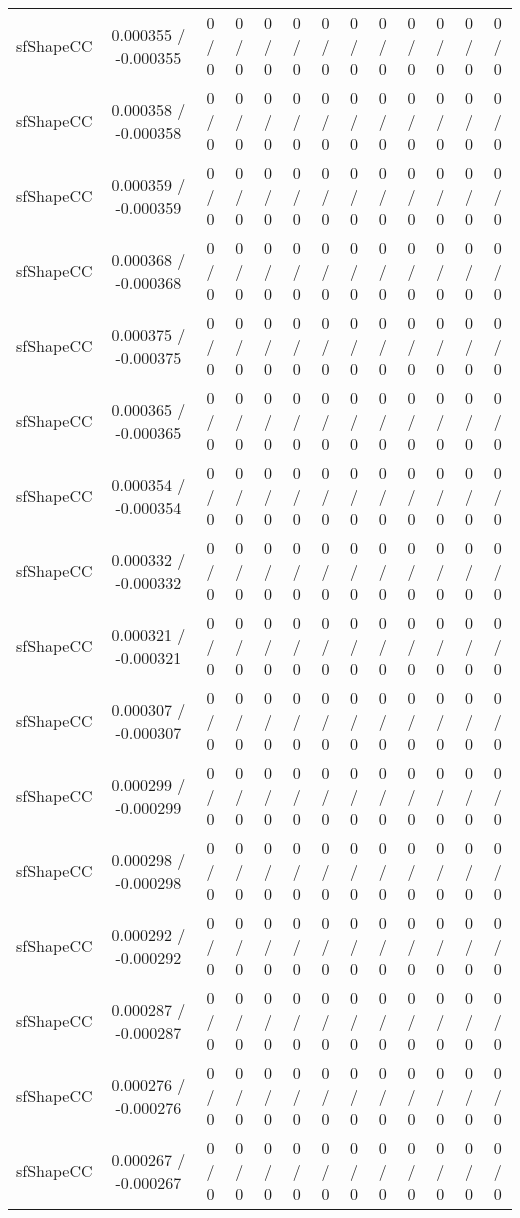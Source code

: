 \documentclass[10pt]{article}
\begin{document}
\begin{table}[htbp]
\begin{center}
\begin{tabular}{|c|c|c|c|c|c|c|c|c|c|c|c|c|}
  sfShapeCC & 0.000355 / -0.000355 & 0 / 0 & 0 / 0 & 0 / 0 & 0 / 0 & 0 / 0 & 0 / 0 & 0 / 0 & 0 / 0 & 0 / 0 & 0 / 0 & 0 / 0 \\ 
  sfShapeCC & 0.000358 / -0.000358 & 0 / 0 & 0 / 0 & 0 / 0 & 0 / 0 & 0 / 0 & 0 / 0 & 0 / 0 & 0 / 0 & 0 / 0 & 0 / 0 & 0 / 0 \\ 
  sfShapeCC & 0.000359 / -0.000359 & 0 / 0 & 0 / 0 & 0 / 0 & 0 / 0 & 0 / 0 & 0 / 0 & 0 / 0 & 0 / 0 & 0 / 0 & 0 / 0 & 0 / 0 \\ 
  sfShapeCC & 0.000368 / -0.000368 & 0 / 0 & 0 / 0 & 0 / 0 & 0 / 0 & 0 / 0 & 0 / 0 & 0 / 0 & 0 / 0 & 0 / 0 & 0 / 0 & 0 / 0 \\ 
  sfShapeCC & 0.000375 / -0.000375 & 0 / 0 & 0 / 0 & 0 / 0 & 0 / 0 & 0 / 0 & 0 / 0 & 0 / 0 & 0 / 0 & 0 / 0 & 0 / 0 & 0 / 0 \\ 
  sfShapeCC & 0.000365 / -0.000365 & 0 / 0 & 0 / 0 & 0 / 0 & 0 / 0 & 0 / 0 & 0 / 0 & 0 / 0 & 0 / 0 & 0 / 0 & 0 / 0 & 0 / 0 \\ 
  sfShapeCC & 0.000354 / -0.000354 & 0 / 0 & 0 / 0 & 0 / 0 & 0 / 0 & 0 / 0 & 0 / 0 & 0 / 0 & 0 / 0 & 0 / 0 & 0 / 0 & 0 / 0 \\ 
  sfShapeCC & 0.000332 / -0.000332 & 0 / 0 & 0 / 0 & 0 / 0 & 0 / 0 & 0 / 0 & 0 / 0 & 0 / 0 & 0 / 0 & 0 / 0 & 0 / 0 & 0 / 0 \\ 
  sfShapeCC & 0.000321 / -0.000321 & 0 / 0 & 0 / 0 & 0 / 0 & 0 / 0 & 0 / 0 & 0 / 0 & 0 / 0 & 0 / 0 & 0 / 0 & 0 / 0 & 0 / 0 \\ 
  sfShapeCC & 0.000307 / -0.000307 & 0 / 0 & 0 / 0 & 0 / 0 & 0 / 0 & 0 / 0 & 0 / 0 & 0 / 0 & 0 / 0 & 0 / 0 & 0 / 0 & 0 / 0 \\ 
  sfShapeCC & 0.000299 / -0.000299 & 0 / 0 & 0 / 0 & 0 / 0 & 0 / 0 & 0 / 0 & 0 / 0 & 0 / 0 & 0 / 0 & 0 / 0 & 0 / 0 & 0 / 0 \\ 
  sfShapeCC & 0.000298 / -0.000298 & 0 / 0 & 0 / 0 & 0 / 0 & 0 / 0 & 0 / 0 & 0 / 0 & 0 / 0 & 0 / 0 & 0 / 0 & 0 / 0 & 0 / 0 \\ 
  sfShapeCC & 0.000292 / -0.000292 & 0 / 0 & 0 / 0 & 0 / 0 & 0 / 0 & 0 / 0 & 0 / 0 & 0 / 0 & 0 / 0 & 0 / 0 & 0 / 0 & 0 / 0 \\ 
  sfShapeCC & 0.000287 / -0.000287 & 0 / 0 & 0 / 0 & 0 / 0 & 0 / 0 & 0 / 0 & 0 / 0 & 0 / 0 & 0 / 0 & 0 / 0 & 0 / 0 & 0 / 0 \\ 
  sfShapeCC & 0.000276 / -0.000276 & 0 / 0 & 0 / 0 & 0 / 0 & 0 / 0 & 0 / 0 & 0 / 0 & 0 / 0 & 0 / 0 & 0 / 0 & 0 / 0 & 0 / 0 \\ 
  sfShapeCC & 0.000267 / -0.000267 & 0 / 0 & 0 / 0 & 0 / 0 & 0 / 0 & 0 / 0 & 0 / 0 & 0 / 0 & 0 / 0 & 0 / 0 & 0 / 0 & 0 / 0 \\ 

\end{tabular}
\end{center}
\end{table}
\end{document}
